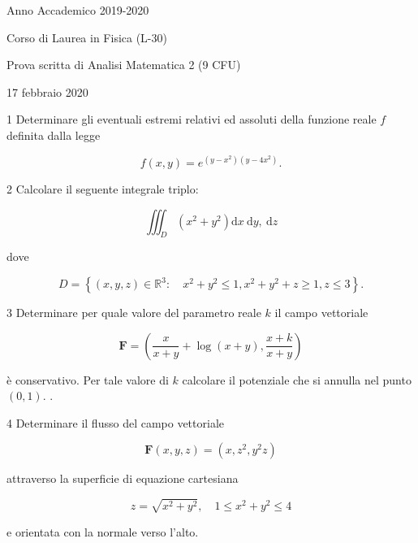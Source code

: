 \documentclass[10pt]{article}
\begin{document}
Anno Accademico 2019-2020

Corso di Laurea in Fisica (L-30)

Prova scritta di Analisi Matematica 2 (9 CFU)

17 febbraio 2020

1 Determinare gli eventuali estremi relativi ed assoluti della funzione reale \(f\) definita dalla legge

\[
f(x, y)=e^{\left(y-x^{2}\right)\left(y-4 x^{2}\right)} .
\]

2 Calcolare il seguente integrale triplo:

\[
\iiint_{D}\left(x^{2}+y^{2}\right) \mathrm{d} x \mathrm{~d} y, \mathrm{~d} z
\]

dove

\[
D=\left\{(x, y, z) \in \mathbb{R}^{3}: \quad x^{2}+y^{2} \leq 1, x^{2}+y^{2}+z \geq 1, z \leq 3\right\} .
\]

3 Determinare per quale valore del parametro reale \(k\) il campo vettoriale

\[
\mathbf{F}=\left(\frac{x}{x+y}+\log (x+y), \frac{x+k}{x+y}\right)
\]

è conservativo. Per tale valore di \(k\) calcolare il potenziale che si annulla nel punto \((0,1)\). .

4 Determinare il flusso del campo vettoriale

\[
\mathbf{F}(x, y, z)=\left(x, z^{2}, y^{2} z\right)
\]

attraverso la superficie di equazione cartesiana

\[
z=\sqrt{x^{2}+y^{2}}, \quad 1 \leq x^{2}+y^{2} \leq 4
\]

e orientata con la normale verso l'alto.
\end{document}
